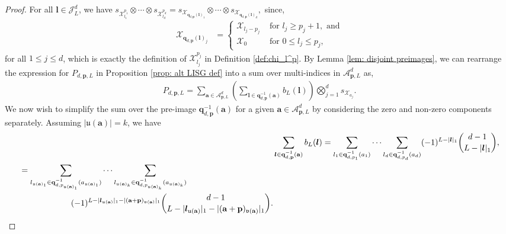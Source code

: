 \documentclass[pdflatex,sn-mathphys-num]{sn-jnl}%
\theoremstyle{thmstyleone}%
\theoremstyle{thmstyletwo}%
\theoremstyle{thmstylethree}%
\begin{document}
\begin{proof}
    For all \(\boldsymbol{l}\in\mathcal{J}_L^d\), we have
    \(s_{\mathcal{X}_{l_1}^{p_1}}\otimes\cdots\otimes s_{\mathcal{X}_{l_d}^{p_d}} = s_{\mathcal{X}_{\mathbf{q}_{d,\mathbf{p}}(\boldsymbol{l})_1}}\otimes\cdots\otimes s_{\mathcal{X}_{\mathbf{q}_{d,\mathbf{p}}(\boldsymbol{l})_d}},
    \)
    since,
    \begin{align}
        \mathcal{X}_{\mathbf{q}_{d,\mathbf{p}}(\boldsymbol{l})_j}&=\begin{cases}
            \mathcal{X}_{l_j-p_j}&\textrm{ for }l_j\geq p_j+1,\textrm{ and}\\
            \mathcal{X}_0&\textrm{ for }0\leq l_j\leq p_j,
            \end{cases}\nonumber
    \end{align}
    for all \(1\leq j\leq d\), which is exactly the definition of \(\mathcal{X}_{l_j}^{p_j}\) in Definition \ref{def:chi_l^p}. 
    By Lemma \ref{lem: disjoint preimages}, we can rearrange the expression for \(P_{d,\mathbf{p},L}\) in Proposition \ref{prop: alt LISG def} into a sum over multi-indices in \(\mathcal{A}_{\mathbf{p},L}^d\) as,
    \begin{align}
        P_{d,\mathbf{p},L}=\sum_{\mathbf{a}\in\mathcal{A}_{\mathbf{p},L}^d}\left(\sum_{\boldsymbol{l}\in \mathbf{q}_{d,\mathbf{p}}^{-1}(\mathbf{a})}b_{L}(\boldsymbol{l})\right)\bigotimes_{j=1}^d s_{\mathcal{X}_{a_j}}.\nonumber
    \end{align}
    We now wish to simplify the sum over the pre-image \(\mathbf{q}_{d,\mathbf{p}}^{-1}(\mathbf{a})\) for a given \(\mathbf{a}\in\mathcal{A}_{\mathbf{p},L}^d\) by considering the zero and non-zero components separately. Assuming \(|\mathfrak{u}(\mathbf{a})|=k\), we have
    \begin{align}
        &\sum_{\boldsymbol{l}\in \mathbf{q}_{d,\mathbf{p}}^{-1}(\mathbf{a})}b_{L}(\boldsymbol{l})=\sum_{l_1\in \mathbf{q}_{d,p_1}^{-1}(a_1)}\cdots\sum_{l_d\in \mathbf{q}_{d,p_d}^{-1}(a_d)}(-1)^{L-|\boldsymbol{l}|_1}\binom{d-1}{L-|\boldsymbol{l}|_1},\nonumber\\
        \begin{split}
        &=\sum_{l_{\mathfrak{u}(\mathbf{a})_1}\in \mathbf{q}_{d,p_{{\mathfrak{u}(\mathbf{a})}_1}}^{-1}(a_{\mathfrak{u}(\mathbf{a})_1})}\cdots\sum_{l_{\mathfrak{u}(\mathbf{a})_k}\in \mathbf{q}_{d,p_{{\mathfrak{u}(\mathbf{a})}_k}}^{-1}(a_{\mathfrak{u}(\mathbf{a})_k})}\\
        &\hspace{2.2cm}(-1)^{L-|\boldsymbol{l}_{\mathfrak{u}(\mathbf{a})}|_1-|(\mathbf{a}+\mathbf{p})_{\mathfrak{v}(\mathbf{a})}|_1}\binom{d-1}{L-|\boldsymbol{l}_{\mathfrak{u}(\mathbf{a})}|_1-|(\mathbf{a}+\mathbf{p})_{\mathfrak{v}(\mathbf{a})}|_1}.

\end{split}
\end{align}
\end{proof}
\end{document}
